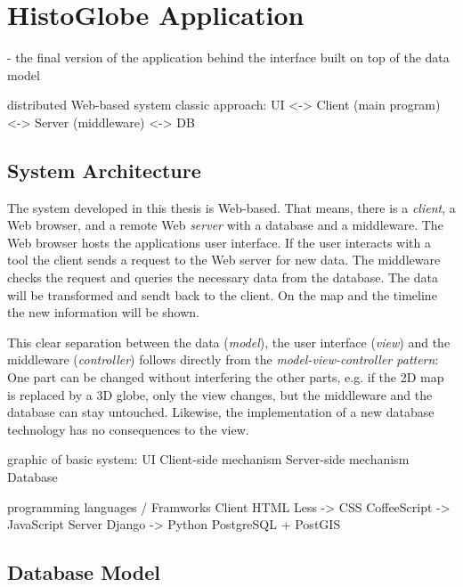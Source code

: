\section{HistoGlobe Application} %
\label{sec:histoglobe_application}

- the final version of the application behind the interface built on top of the data model

distributed Web-based system
classic approach: UI <-> Client (main program) <-> Server (middleware) <-> DB

\subsection{System Architecture} %
\label{sub:system_architecture}


The system developed in this thesis is Web-based. That means, there is a \emph{client}, a Web browser, and a remote Web \emph{server} with a database and a middleware. The Web browser hosts the applications user interface. If the user interacts with a tool the client sends a request to the Web server for new data. The middleware checks the request and queries the necessary data from the database. The data will be transformed and sendt back to the client. On the map and the timeline the new information will be shown.

This clear separation between the data (\emph{model}), the user interface (\emph{view}) and the middleware (\emph{controller}) follows directly from the \emph{model-view-controller pattern}: One part can be changed without interfering the other parts, e.g. if the 2D map is replaced by a 3D globe, only the view changes, but the middleware and the database can stay untouched. Likewise, the implementation of a new database technology has no consequences to the view.

graphic of basic system:
UI
Client-side mechanism
Server-side mechanism
Database

programming languages / Framworks
Client                    HTML
          Less ->         CSS
          CoffeeScript -> JavaScript
Server    Django ->       Python
                          PostgreSQL
                          + PostGIS


\subsection{Database Model} %
\label{sub:database_model}

